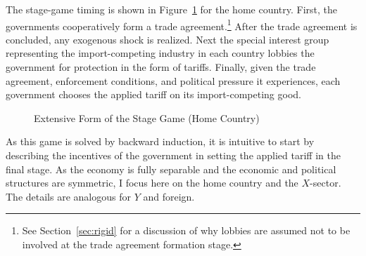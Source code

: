\documentclass[12pt,titlepage]{article}
\begin{document}
The stage-game timing is shown in Figure~\ref{fig:ext} for the home country. First, the governments cooperatively form a trade agreement.\footnote{See Section~\ref{sec:rigid} for a discussion of why lobbies are assumed not to be involved at the trade agreement formation stage.} After the trade agreement is concluded, any exogenous shock is realized. Next the special interest group representing the import-competing industry in each country lobbies the government for protection in the form of tariffs. Finally, given the trade agreement, enforcement conditions, and political pressure it experiences, each government chooses the applied tariff on its import-competing good.

\begin{figure}
	\begin{center}
		
	\end{center}
	\caption{Extensive Form of the Stage Game (Home Country)\label{fig:ext}}
\end{figure}


As this game is solved by backward induction, it is intuitive to start by describing the incentives of the government in setting the applied tariff in the final stage. As the economy is fully separable and the economic and political structures are symmetric, I focus here on the home country and the $X$-sector. The details are analogous for $Y$ and foreign.
\end{document}
